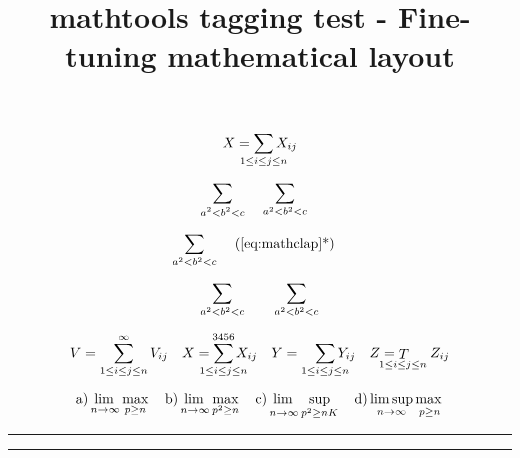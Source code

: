 \documentclass{article}
\title{mathtools tagging test - Fine-tuning mathematical layout}
\begin{document}
\[
X = \sum_{\mathclap{1\le i\le j\le n}} X_{ij}
\]

\begin{equation}\label{eq:mathclap}
\sum_{\mathclap{a^2<b^2<c}}\qquad
\sum_{a^2<b^2<c}
\end{equation}

\begin{equation*}\label{eq:mathclap-b}
\sum_{\crampedclap{a^2<b^2<c}}
\tag{\ref{eq:mathclap}*}
\end{equation*}

\[
\sum_{\crampedsubstack{a^2<b^2<c}}\qquad
\sum_{a^2<b^2<c}
\]

\[
V = \sum_{1\le i\le j\le n}^{\infty} V_{ij} \quad
X = \smashoperator{\sum_{1\le i\le j\le n}^{3456}} X_{ij} \quad
Y = \smashoperator[r]{\sum\limits_{1\le i\le j\le n}} Y_{ij} \quad
Z = \smashoperator[l]{\mathop{T}_{1\le i\le j\le n}} Z_{ij}
\]

\[
\text{a)} \adjustlimits\lim_{n\to\infty} \max_{p\ge n} \quad
\text{b)} \adjustlimits\lim_{n\to\infty} \max_{p^2\ge n} \quad
\text{c)} \adjustlimits\lim_{n\to\infty} \sup_{p^2\ge nK} \quad
\text{d)} \adjustlimits\limsup_{n\to\infty} \max_{p\ge n}
\]

\noindent\rule\textwidth{1pt}
\begin{align*} A &= B \end{align*}
\noindent\rule\textwidth{1pt}
\begin{align*}
\SwapAboveDisplaySkip
A &= B
\end{align*}
\end{document}
